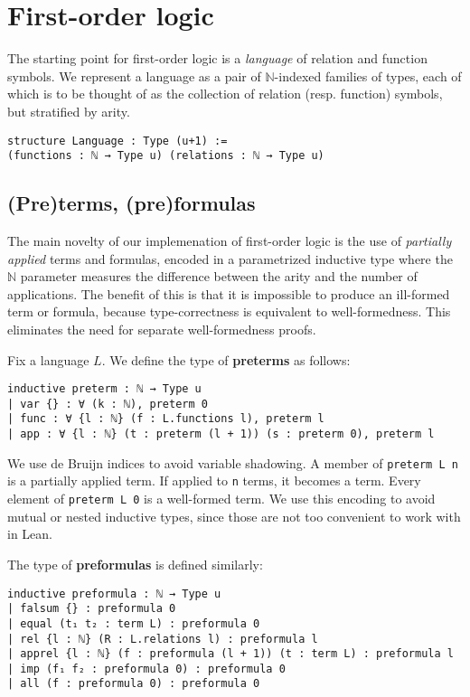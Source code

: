 \documentclass[a4paper,USenglish,cleveref, autoref]{lipics-v2019}
\newcommand{\lil}{\lstinline}
\newcommand{\N}{\mathbb{N}}
\theoremstyle{definition}
\begin{document}
\section{First-order logic}
\label{sect:fol}
The starting point for first-order logic is a \emph{language} of relation and function symbols. We represent a language as a pair of $\N$-indexed families of types, each of which is to be thought of as the collection of relation (resp. function) symbols, but stratified by arity.

\begin{lstlisting}
structure Language : Type (u+1) :=
(functions : ℕ → Type u) (relations : ℕ → Type u)
\end{lstlisting}

\subsection{(Pre)terms, (pre)formulas}
The main novelty of our implemenation of first-order logic is the use of \emph{partially applied} terms and formulas, encoded in a parametrized inductive type where the $\N$ parameter measures the difference between the arity and the number of applications. The benefit of this is that it is impossible to produce an ill-formed term or formula, because type-correctness is equivalent to well-formedness. This eliminates the need for separate well-formedness proofs.

Fix a language $L$. We define the type of \textbf{preterms} as follows:
\begin{lstlisting}
inductive preterm : ℕ → Type u
| var {} : ∀ (k : ℕ), preterm 0
| func : ∀ {l : ℕ} (f : L.functions l), preterm l
| app : ∀ {l : ℕ} (t : preterm (l + 1)) (s : preterm 0), preterm l
\end{lstlisting}
We use de Bruijn indices to avoid variable shadowing. A member of \lil{preterm L n} is a partially applied term. If applied to \lil{n} terms, it becomes a term. Every element of \lil{preterm L 0} is a well-formed term. We use this encoding to avoid mutual or nested inductive types, since those are not too convenient to work with in Lean.

The type of \textbf{preformulas} is defined similarly:
\begin{lstlisting}
inductive preformula : ℕ → Type u
| falsum {} : preformula 0
| equal (t₁ t₂ : term L) : preformula 0
| rel {l : ℕ} (R : L.relations l) : preformula l
| apprel {l : ℕ} (f : preformula (l + 1)) (t : term L) : preformula l
| imp (f₁ f₂ : preformula 0) : preformula 0
| all (f : preformula 0) : preformula 0
\end{lstlisting}
\end{document}
